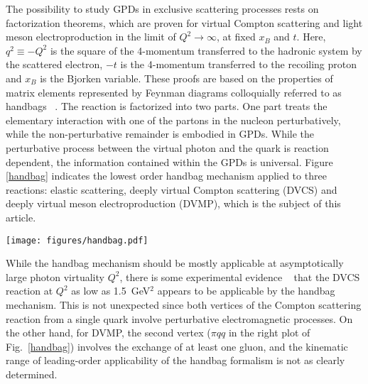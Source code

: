 \documentclass[prc,floatfix,twocolumn,superscriptaddress,letter]{revtex4}
\begin{document}
The possibility to study GPDs in exclusive scattering processes rests on factorization theorems, which are  proven for  virtual Compton scattering
\cite{factorization-compton} and light meson electroproduction \cite{factorization-mesons} in the limit of $Q^2 \to \infty$,  at fixed $x_B$ and $t$.  
Here, $q^2 \equiv -Q^2$ is the square of the 4-momentum transferred  to the hadronic system by the scattered electron, $-t$ is the 4-momentum transferred to the recoiling proton
and $x_B$ is the Bjorken variable. 
These proofs are based on the properties of matrix elements represented by Feynman diagrams colloquially referred to as  handbags ~\cite{Ji,Radyushkin,Muller}.
The reaction  is factorized into two parts.
One part treats the elementary interaction with one of the partons in the nucleon perturbatively, while the non-perturbative remainder is embodied in GPDs.   
While the perturbative process between the virtual photon and the quark is reaction dependent, the information contained within the GPDs is universal.  Figure \ref{handbag} indicates the lowest order handbag mechanism applied to three reactions: elastic scattering, deeply virtual Compton scattering (DVCS) and deeply virtual meson electroproduction (DVMP), which is the subject of this article. 


\begin{figure*}
\texttt{[image: figures/handbag.pdf]}
\caption{\label{handbag}(Color online) Schematic diagram of the lowest order handbag mechanism applied to: (left) elastic scattering, (middle) DVCS and (right) meson production.
}
\end{figure*}

While the handbag mechanism should be mostly applicable at asymptotically  large photon virtuality $Q^2$, there is some experimental evidence ~\cite{dvcs-halla} that  the DVCS reaction at $Q^2$ as low as 1.5~GeV$^2$  appears to be applicable by the handbag mechanism.  This is not unexpected since both vertices of the Compton scattering reaction from a single quark  involve perturbative electromagnetic processes.  
On the other hand, for DVMP,  the second vertex ($\pi qq$ in the right plot of Fig.~\ref{handbag}) involves the exchange of at least one gluon, and the kinematic range of leading-order applicability of the handbag formalism is not as clearly determined. 
\end{document}
